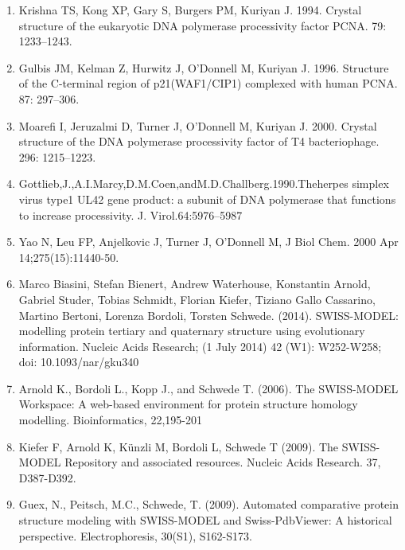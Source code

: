 \documentclass[a4paper,12pt]{article}
\begin{document}
\begin{enumerate}
	\item Krishna TS, Kong XP, Gary S, Burgers PM, Kuriyan J. 1994. Crystal structure of the eukaryotic DNA polymerase processivity factor PCNA. 79: 1233–1243.
	
	\item Gulbis JM, Kelman Z, Hurwitz J, O’Donnell M, Kuriyan J. 1996. Structure of the C-terminal region of p21(WAF1/CIP1) complexed with human PCNA. 87: 297–306.
	
	\item Moarefi I, Jeruzalmi D, Turner J, O’Donnell M, Kuriyan J. 2000. Crystal structure of the DNA polymerase processivity factor of T4 bacteriophage. 296: 1215–1223.
	
	\item \hypertarget{Gottlieb}{Gottlieb,J.,A.I.Marcy,D.M.Coen,andM.D.Challberg.1990.Theherpes simplex virus type1 UL42 gene product: a subunit of DNA polymerase that functions to increase processivity. J. Virol.64:5976–5987}
	
	\item \hypertarget{YaoN}{Yao N, Leu FP, Anjelkovic J, Turner J, O'Donnell M, J Biol Chem. 2000 Apr 14;275(15):11440-50.}

	\item \hypertarget{swissprot}{Marco Biasini, Stefan Bienert, Andrew Waterhouse, Konstantin Arnold, Gabriel Studer, Tobias Schmidt, Florian Kiefer, Tiziano Gallo Cassarino, Martino Bertoni, Lorenza Bordoli, Torsten Schwede. (2014). SWISS-MODEL: modelling protein tertiary and quaternary structure using evolutionary information. Nucleic Acids Research; (1 July 2014) 42 (W1): W252-W258; doi: 10.1093/nar/gku340} 
	
	\item Arnold K., Bordoli L., Kopp J., and Schwede T. (2006). The SWISS-MODEL Workspace: A web-based environment for protein structure homology modelling. Bioinformatics, 22,195-201
	
	\item Kiefer F, Arnold K, Künzli M, Bordoli L, Schwede T (2009). The SWISS-MODEL Repository and associated resources. Nucleic Acids Research. 37, D387-D392.
	
	\item Guex, N., Peitsch, M.C., Schwede, T. (2009). Automated comparative protein structure modeling with SWISS-MODEL and Swiss-PdbViewer: A historical perspective. Electrophoresis, 30(S1), S162-S173.
	

	
\end{enumerate}
  
\end{document}
